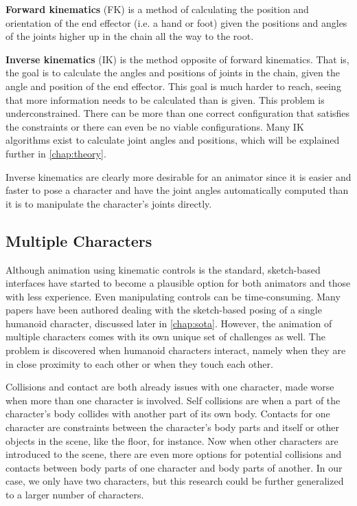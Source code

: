 \textbf{Forward kinematics} (FK) is a method of calculating the position and orientation of the end effector (i.e. a hand or foot) given the positions and angles of the joints higher up in the chain all the way to the root. 

\textbf{Inverse kinematics} (IK) is the method opposite of forward kinematics. That is, the goal is to calculate the angles and positions of joints in the chain, given the angle and position of the end effector. This goal is much harder to reach, seeing that more information needs to be calculated than is given. This problem is underconstrained. There can be more than one correct configuration that satisfies the constraints or there can even be no viable configurations. Many IK algorithms exist to calculate joint angles and positions, which will be explained further in \autoref{chap:theory}.

Inverse kinematics are clearly more desirable for an animator since it is easier and faster to pose a character and have the joint angles automatically computed than it is to manipulate the character's joints directly.

\subsection{Multiple Characters}
Although animation using kinematic controls is the standard, sketch-based interfaces have started to become a plausible option for both animators and those with less experience. Even manipulating controls can be time-consuming. Many papers have been authored dealing with the sketch-based posing of a single humanoid character, discussed later in \autoref{chap:sota}. However, the animation of multiple characters comes with its own unique set of challenges as well. The problem is discovered when humanoid characters interact, namely when they are in close proximity to each other or when they touch each other.

Collisions and contact are both already issues with one character, made worse when more than one character is involved. Self collisions are when a part of the character's body collides with another part of its own body. Contacts for one character are constraints between the character's body parts and itself or other objects in the scene, like the floor, for instance. Now when other characters are introduced to the scene, there are even more options for potential collisions and contacts between body parts of one character and body parts of another. In our case, we only have two characters, but this research could be further generalized to a larger number of characters.


